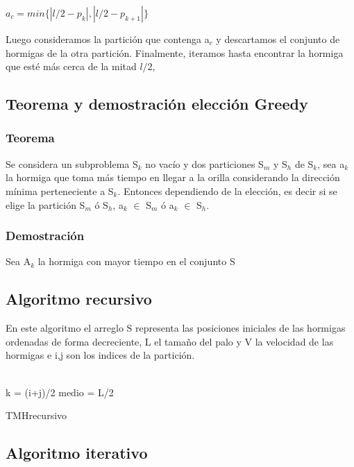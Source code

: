 \documentclass[11pt,spanish]{article}
\begin{document}
\begin{center} $a_{c} = min\{|l/2-p_k|,|l/2-p_{k+1}|\}$\end{center}
Luego consideramos la partición que contenga a$_{c}$ y descartamos el conjunto de hormigas de la otra partición. Finalmente, iteramos hasta encontrar la hormiga que esté más cerca de la mitad $l/2$,
\subsection{Teorema y demostración elección Greedy}
\subsubsection{Teorema}
Se considera un subproblema S$_{k}$ no vacío y dos particiones S$_{m}$ y S$_{h}$ de S$_{k}$, sea a$_{k}$ la hormiga que toma más tiempo en llegar a la orilla considerando la dirección mínima perteneciente a S$_{k}$. Entonces dependiendo de la elección, es decir si se elige la partición S$_{m}$ ó S$_{h}$, a$_{k}$ $\in$ S$_{m}$ ó a$_{k}$ $\in$ S$_{h}$.
\subsubsection{Demostración}
Sea A$_{k}$ la hormiga con mayor tiempo en el conjunto S
\subsection{Algoritmo recursivo}
En este algoritmo el arreglo S representa las posiciones iniciales de las hormigas ordenadas de forma decreciente, L el tamaño del palo y V la velocidad de las hormigas e i,j son los indices de la partición.\\\\
\begin{algorithm}[H]
 k = (i+j)/2\;
 medio = L/2\;
 \caption{TMHrecursivo}
 \label{fig:algo1}
\end{algorithm}
\subsection{Algoritmo iterativo}
\end{document}
